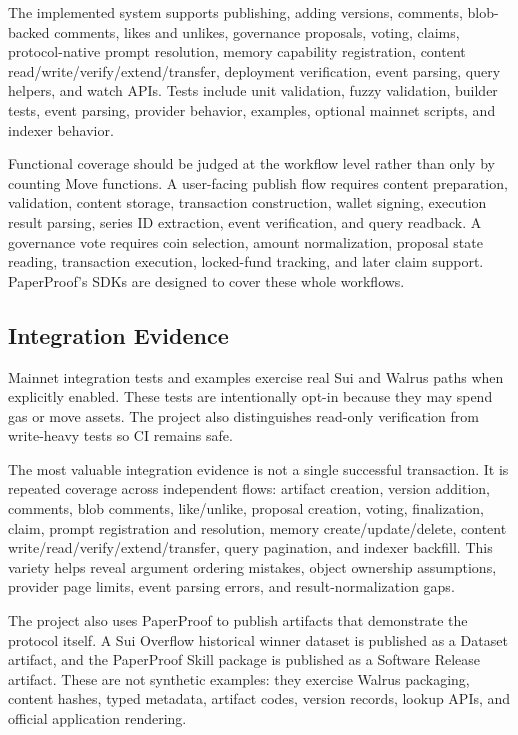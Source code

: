 \documentclass[journal]{IEEEtran}
\begin{document}
The implemented system supports publishing, adding versions, comments, blob-backed comments, likes and unlikes, governance proposals, voting, claims, protocol-native prompt resolution, memory capability registration, content read/write/verify/extend/transfer, deployment verification, event parsing, query helpers, and watch APIs. Tests include unit validation, fuzzy validation, builder tests, event parsing, provider behavior, examples, optional mainnet scripts, and indexer behavior.

Functional coverage should be judged at the workflow level rather than only by counting Move functions. A user-facing publish flow requires content preparation, validation, content storage, transaction construction, wallet signing, execution result parsing, series ID extraction, event verification, and query readback. A governance vote requires coin selection, amount normalization, proposal state reading, transaction execution, locked-fund tracking, and later claim support. PaperProof's SDKs are designed to cover these whole workflows.

\subsection{Integration Evidence}

Mainnet integration tests and examples exercise real Sui and Walrus paths when explicitly enabled. These tests are intentionally opt-in because they may spend gas or move assets. The project also distinguishes read-only verification from write-heavy tests so CI remains safe.

The most valuable integration evidence is not a single successful transaction. It is repeated coverage across independent flows: artifact creation, version addition, comments, blob comments, like/unlike, proposal creation, voting, finalization, claim, prompt registration and resolution, memory create/update/delete, content write/read/verify/extend/transfer, query pagination, and indexer backfill. This variety helps reveal argument ordering mistakes, object ownership assumptions, provider page limits, event parsing errors, and result-normalization gaps.

The project also uses PaperProof to publish artifacts that demonstrate the
protocol itself. A Sui Overflow historical winner dataset is published as a
Dataset artifact, and the PaperProof Skill package is published as a Software
Release artifact. These are not synthetic examples: they exercise Walrus
packaging, content hashes, typed metadata, artifact codes, version records,
lookup APIs, and official application rendering.
\end{document}
